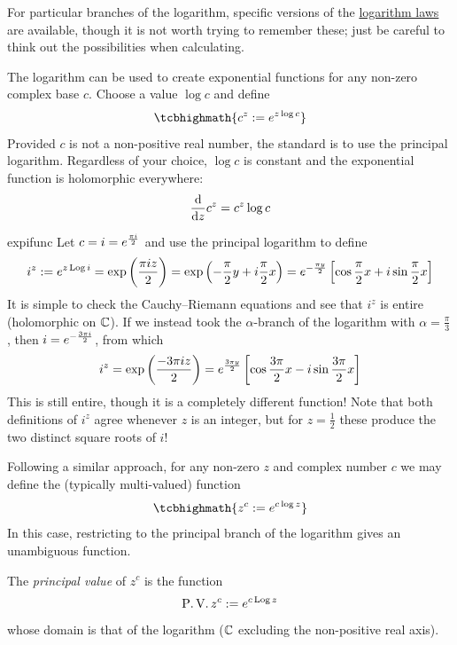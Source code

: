 For particular branches of the logarithm, specific versions of the \hyperlink{sec:loglaws}{logarithm laws} are available, though it is not worth trying to remember these; just be careful to think out the possibilities when calculating.




The logarithm can be used to create exponential functions for any non-zero complex base $c$. Choose a value $\log c$ and define
\[
	\tcbhighmath{c^z:=e^{z\log c}}
\]
Provided $c$ is not a non-positive real number, the standard is to use the principal logarithm. Regardless of your choice, $\log c$ is constant and the exponential function is holomorphic everywhere:
\[
	\frac{\mathrm{d} }{\mathrm{d} z}c^z=c^z\log c
\]

\begin{example}{}{expifunc}
	Let $c=i=e^{\frac{\pi i}{2}}$ and use the principal logarithm to define
	\[
		i^z:=e^{z\operatorname{Log} i}=\exp\left(\frac{\pi iz}2\right) =\exp\left(-\frac\pi 2y+i\frac\pi 2x\right) =e^{-\frac{\pi y}{2}}\left[\cos\frac\pi 2x+i\sin\frac\pi 2x\right]
	\]
	It is simple to check the Cauchy--Riemann equations and see that $i^z$ is entire (holomorphic on $\mathbb{C}$).\smallbreak
	If we instead took the $\alpha$-branch of the logarithm with $\alpha=\frac\pi 3$, then $i=e^{-\frac{3\pi i}{2}}$, from which
	\[
		i^z=\exp\left(\frac{-3\pi iz}2\right) =e^{\frac{3\pi y}{2}}\left[\cos\frac{3\pi}2x-i\sin\frac{3\pi}2x\right]
	\]
	This is still entire, though it is a completely different function! Note that both definitions of $i^z$ agree whenever $z$ is an integer, but for $z=\frac 12$ these produce the two distinct square roots of $i$!
\end{example}

\goodbreak




Following a similar approach, for any non-zero $z$ and complex number $c$ we may define the (typically multi-valued) function
\[
	\tcbhighmath{z^c:=e^{c\log z}}
\]
In this case, restricting to the principal branch of the logarithm gives an unambiguous function.

\begin{defn}{}{}
	The \emph{principal value} of $z^c$ is the function
	\[
		\operatorname{P.V.}z^c:=e^{c\operatorname{Log} z}
	\]
	whose domain is that of the logarithm ($\mathbb{C}$ excluding the non-positive real axis).
\end{defn}




